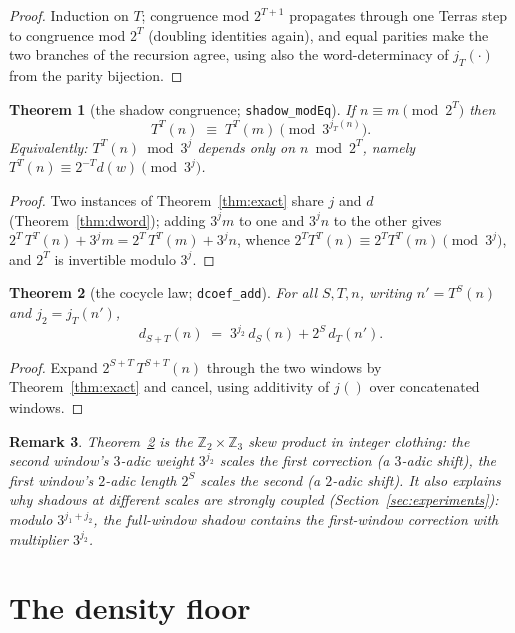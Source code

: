 \documentclass[11pt]{article}
\newtheorem{theorem}{Theorem}[section]
\newtheorem{remark}[theorem]{Remark}
\newcommand{\Z}{\mathbb{Z}}
\newcommand{\Ztwo}{\Z_2}
\newcommand{\Zthree}{\Z_3}
\newcommand{\code}[1]{\texttt{#1}}
\newcommand{\jodd}[2]{j_{#1}(#2)}
\begin{document}
\begin{proof}
Induction on $T$; congruence mod $2^{T+1}$ propagates through one
Terras step to congruence mod $2^T$ (doubling identities again), and
equal parities make the two branches of the recursion agree, using
also the word-determinacy of $\jodd{T}{\cdot}$ from the parity
bijection.
\end{proof}

\begin{theorem}[the shadow congruence; \code{shadow\_modEq}]
\label{thm:shadow}
If $n \equiv m \pmod{2^T}$ then
\[
T^T(n) \;\equiv\; T^T(m) \pmod{3^{\jodd{T}{n}}}.
\]
Equivalently: $T^T(n) \bmod 3^{j}$ depends only on $n \bmod 2^T$,
namely $T^T(n) \equiv 2^{-T} d(w) \pmod {3^j}$.
\end{theorem}

\begin{proof}
Two instances of Theorem~\ref{thm:exact} share $j$ and $d$
(Theorem~\ref{thm:dword}); adding $3^j m$ to one and $3^j n$ to the
other gives
$2^T\,T^T(n) + 3^j m = 2^T\, T^T(m) + 3^j n$, whence
$2^T T^T(n) \equiv 2^T T^T(m) \pmod{3^j}$, and $2^T$ is invertible
modulo $3^j$.
\end{proof}

\begin{theorem}[the cocycle law; \code{dcoef\_add}]\label{thm:cocycle}
For all $S, T, n$, writing $n' = T^S(n)$ and $j_2 = \jodd{T}{n'}$,
\[
d_{S+T}(n) \;=\; 3^{j_2}\, d_S(n) + 2^{S}\, d_T(n').
\]
\end{theorem}

\begin{proof}
Expand $2^{S+T}\,T^{S+T}(n)$ through the two windows by
Theorem~\ref{thm:exact} and cancel, using additivity of $\jodd{}{}$
over concatenated windows.
\end{proof}

\begin{remark}
Theorem~\ref{thm:cocycle} is the $\Ztwo \times \Zthree$ skew product
in integer clothing: the second window's $3$-adic weight $3^{j_2}$
scales the first correction (a $3$-adic shift), the first window's
$2$-adic length $2^S$ scales the second (a $2$-adic shift). It also
explains why shadows at different scales are strongly coupled
(Section~\ref{sec:experiments}): modulo $3^{j_1 + j_2}$, the
full-window shadow contains the first-window correction with
multiplier $3^{j_2}$.
\end{remark}

\section{The density floor}\label{sec:floor}
\end{document}
